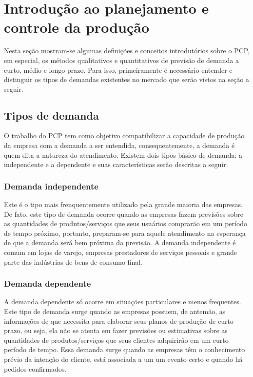 \chapter{Introdução ao planejamento e controle da produção}
\label{chap:introducao_ao_planejamento}

Nesta seção mostram-se algumas definições e conceitos introdutórios sobre o \ac{PCP}, em especial, os métodos qualitativos e quantitativos de previsão de demanda a curto, médio e longo prazo. Para isso, primeiramente é necessário entender e distinguir os tipos de demandas existentes no mercado que serão vistos na seção a seguir.

\section{Tipos de demanda}
\label{sec:introducao_ao_planejamento_sec1}

O trabalho do \ac{PCP} tem como objetivo compatibilizar a capacidade de produção da empresa com a demanda a ser entendida, consequentemente, a demanda é quem dita a natureza do atendimento. Existem dois tipos básico de demanda: a independente e a dependente e suas características serão descritas a seguir.

\subsection{Demanda independente}

Este é o tipo mais frenquentemente utilizado pela grande maioria das empresas. De fato, este tipo de demanda ocorre quando as empresas fazem previsões sobre as quantidades de produtos/serviços que seus usuários comprarão em um período de tempo próximo, portanto, preparam-se para aquele atendimento na esperança de que a demanda será bem próxima da previsão. A demanda independente é comum em lojas de varejo, empresas prestadores de serviços pessoais e grande parte das indústrias de bens de consumo final.

\subsection{Demanda dependente}

A demanda dependente só ocorre em situações particulares e menos frequentes. Este tipo de demanda surge quando as empresas possuem, de antemão, as informações de que necessita para elaborar seus planos de produção de curto prazo, ou seja, ela não se atenta em fazer previsões ou estimativas sobre as quantidades de produtos/serviços que seus clientes adquirirão em um curto período de tempo. Essa demanda surge quando as empresas têm o conhecimento prévio da intenção do cliente, está associada a um um evento certo e quando há pedidos confirmados.

